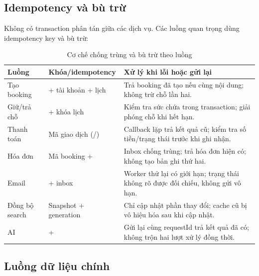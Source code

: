 \subsection{Idempotency và bù trừ}

Không có transaction phân tán giữa các dịch vụ. Các luồng quan trọng dùng idempotency key và bù trừ:

\begin{table}[H]
\centering
\caption{Cơ chế chống trùng và bù trừ theo luồng}
\label{tab:idempotency}
\small
\begin{tabularx}{\textwidth}{@{}L{3.2cm}L{4.2cm}Y@{}}
\toprule
\textbf{Luồng} & \textbf{Khóa/idempotency} & \textbf{Xử lý khi lỗi hoặc gửi lại}\\
\midrule
Tạo booking &  + tài khoản + lịch & Trả booking đã tạo nếu cùng nội dung; không trừ chỗ lần hai.\\
Giữ/trả chỗ &  + khóa lịch & Kiểm tra sức chứa trong transaction; giải phóng chỗ khi hết hạn.\\
Thanh toán & Mã giao dịch (/) & Callback lặp trả kết quả cũ; kiểm tra số tiền/trạng thái trước khi ghi nhận.\\
Hóa đơn & Mã booking +  & Inbox chống trùng; trả hóa đơn hiện có; không tạo bản ghi thứ hai.\\
Email &  + inbox & Worker thử lại có giới hạn; trạng thái không rõ được đối chiếu, không gửi vô hạn.\\
Đồng bộ search & Snapshot + generation & Chỉ cập nhật phần thay đổi; cache cũ bị vô hiệu hóa sau khi cập nhật.\\
AI &  +  & Gửi lại cùng requestId trả kết quả đã có; không trộn hai lượt xử lý đồng thời.\\
\bottomrule
\end{tabularx}
\end{table}

\subsection{Luồng dữ liệu chính}

